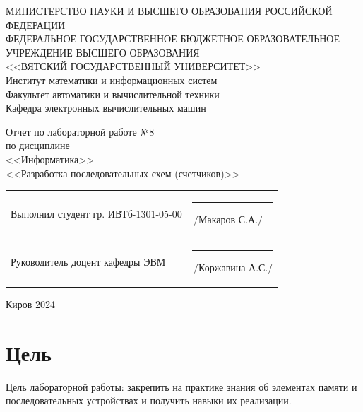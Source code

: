 \documentclass[a4paper,14pt]{extarticle}
\begin{document}
  
  \newpage\thispagestyle{empty}
  \begin{center}
    \MakeUppercase{
      Министерство науки и высшего образования Российской Федерации\\
      Федеральное государственное бюджетное образовательное учреждение высшего образования\\
      <<Вятский Государственный Университет>>\\
    }
    Институт математики и информационных систем\\
    Факультет автоматики и вычислительной техники\\
    Кафедра электронных вычислительных машин
  \end{center}
  \vfill
  
  \begin{center}
    Отчет по лабораторной работе №8\\
    по дисциплине\\
    <<Информатика>>\\
    <<Разработка последовательных схем (счетчиков)>>
  \end{center}
  \vfill
  
  \noindent
  \begin{tabular}{ll}
    Выполнил студент гр. ИВТб-1301-05-00 \hspace{5mm} &
    \rule[-1mm]{25mm}{0.10mm}\,/Макаров С.А./\\
    
    Руководитель доцент кафедры ЭВМ & \rule[-1mm]{25mm}{0.10mm}\,/Коржавина А.С./\\
  \end{tabular}
  
  \vfill
  \begin{center}
    Киров 2024
  \end{center}
  
  \newpage
  \section*{Цель}
  Цель лабораторной работы: закрепить на практике знания об элементах памяти и последовательных устройствах и получить навыки их реализации.
  
\end{document}

